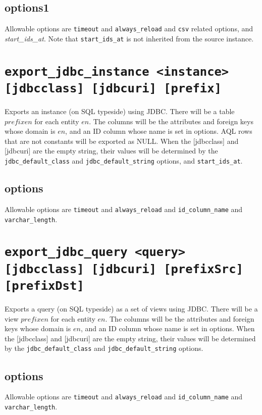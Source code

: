 \documentclass[10pt]{book}
\begin{document}
\subsection{options1}
Allowable options are {\tt timeout} and {\tt always\_reload}  and {\tt csv} related options, and {\it start\_ids\_at}.  Note that {\tt start\_ids\_at} is not inherited from the source instance.

\section{{\tt export\_jdbc\_instance <instance> [jdbcclass] [jdbcuri] [prefix] }}

Exports an instance (on SQL typeside) using JDBC.  There will be a table $prefixen$ for each entity $en$.  The columns will be the attributes and foreign keys whose domain is $en$, and an ID column whose name is set in options.  AQL rows that are not constants will be exported as NULL.  When the [jdbcclass] and [jdbcuri] are the empty string, their values will be determined by the {\tt jdbc\_default\_class} and {\tt jdbc\_default\_string} options, and {\tt start\_ids\_at}.

\subsection{options}
Allowable options are {\tt timeout}  and {\tt always\_reload} and  {\tt id\_column\_name} and {\tt varchar\_length}.

\section{{\tt export\_jdbc\_query <query> [jdbcclass] [jdbcuri] [prefixSrc] [prefixDst] }}

Exports a query (on SQL typeside) as a set of views using JDBC.  There will be a view $prefixen$ for each entity $en$.  The columns will be the attributes and foreign keys whose domain is $en$, and an ID column whose name is set in options.  When the [jdbcclass] and [jdbcuri] are the empty string, their values will be determined by the {\tt jdbc\_default\_class} and {\tt jdbc\_default\_string} options.

\subsection{options}
Allowable options are {\tt timeout}  and {\tt always\_reload} and  {\tt id\_column\_name} and {\tt varchar\_length}.
\end{document}
